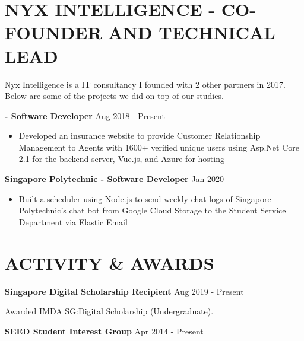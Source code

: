 \documentclass[11pt]{article} %
\begin{document}
\section*{NYX INTELLIGENCE - CO-FOUNDER AND TECHNICAL LEAD}

Nyx Intelligence is a IT consultancy I founded with 2 other partners in 2017. Below are some of the projects we did on top of our studies.

\smallskip

\textbf{\href{https://policyxchange.com}{\color{black}{PolicyXchange.com}} - Software Developer} \hfill Aug 2018 - Present

\smallskip
\begin{itemize}

    \item Developed an insurance website to provide Customer Relationship Management to Agents with 1600+ verified unique users using Asp.Net Core 2.1 for the backend server, Vue.js, and Azure for hosting

\end{itemize}

\medskip

\textbf{Singapore Polytechnic - Software Developer} \hfill Jan 2020

\smallskip
\begin{itemize}

    \item Built a scheduler using Node.js to send weekly chat logs of Singapore Polytechnic's chat bot from Google Cloud Storage to the Student Service Department via Elastic Email

\end{itemize}


\section*{ACTIVITY \& AWARDS}

\textbf{Singapore Digital Scholarship Recipient} \hfill Aug 2019 - Present

Awarded IMDA SG:Digital Scholarship (Undergraduate).

\bigskip

\textbf{SEED Student Interest Group} \hfill Apr 2014 - Present
\end{document}
